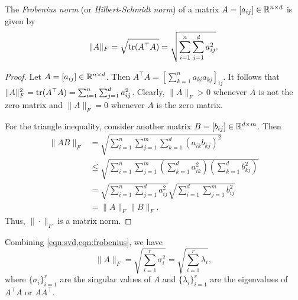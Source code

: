 \begin{theorem}
    \label{thm:frobenius}
    \cite{mohri2012foundations,horn2013matrix}
    The \textit{Frobenius norm} (or \textit{Hilbert-Schmidt norm}) of a matrix \(A = [a_{ij}] \in \mathbb{R}^{n \times d}\) is given by
    \begin{equation}
        \label{eqn:frobenius}
        \|A\|_F = \sqrt{\operatorname{tr}(A^\top A)} = \sqrt{\sum_{i=1}^{n} \sum_{j=1}^{d} a_{ij}^2}.
    \end{equation}
\end{theorem}
\begin{proof}
    Let \(A = [a_{ij}] \in \mathbb{R}^{n \times d}\).
    Then \(A^\top A = \left[\sum_{k=1}^{n} a_{k i} a_{k j}\right]_{ij}\).
    It follows that \(\|A\|_F^2 = \operatorname{tr}(A^\top A) = \sum_{i=1}^{n} \sum_{j=1}^{d} a_{ij}^2\).
    Clearly, \(\|A\|_F > 0\) whenever \(A\) is not the zero matrix and \(\|A\|_F = 0\) whenever \(A\) is the zero matrix.

    For the triangle inequality, consider another matrix \(B = [b_{ij}] \in \mathbb{R}^{d \times m}\).
    Then
    \begin{align*}
        \|AB\|_F
        &= \sqrt{\sum_{i=1}^{n} \sum_{j=1}^{m} \sum_{k=1}^{d} (a_{ik} b_{kj})^2}\\
        &\leq \sqrt{\sum_{i=1}^{n} \sum_{j=1}^{m}
        \left(\sum_{k=1}^{d} a_{ik}^2\right) \left(\sum_{k=1}^{d} b_{kj}^2\right)}\\
        &= \sqrt{\sum_{i=1}^{n} \sum_{j=1}^{d} a_{ij}^2}
        \sqrt{\sum_{i=1}^{d} \sum_{j=1}^{m} b_{ij}^2}\\
        &= \|A\|_F \|B\|_F.
    \end{align*}
    Thus, \(\|\cdot\|_F\) is a matrix norm.
\end{proof}

Combining \cref{eqn:svd,eqn:frobenius}, we have
\begin{equation}
    \label{eqn:frobenius-singular-values}
    \|A\|_F = \sqrt{\sum_{i=1}^{r} \sigma_i^2} = \sqrt{\sum_{i=1}^{r} \lambda_i},
\end{equation}
where \(\{\sigma_i\}_{i=1}^r\) are the singular values of \(A\) and \(\{\lambda_i\}_{i=1}^r\) are the eigenvalues of \(A^\top A\) or \(AA^\top\).